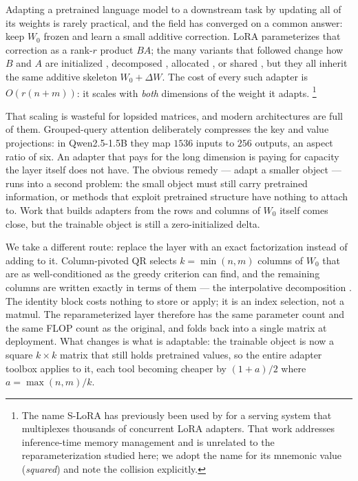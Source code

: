 \documentclass{article}
\theoremstyle{remark}
\begin{document}
Adapting a pretrained language model to a downstream task by updating all of
its weights is rarely practical, and the field has converged on a common
answer: keep $W_0$ frozen and learn a small additive correction. LoRA
\citep{hu2022lora} parameterizes that correction as a rank-$r$ product $BA$;
the many variants that followed change how $B$ and $A$ are initialized
\citep{meng2024pissa,wang2025milora}, decomposed \citep{liu2024dora},
allocated \citep{zhang2023adalora}, or shared
\citep{kopiczko2024vera,balazy2024loraxs}, but they all inherit the same
additive skeleton $W_0 + \Delta W$. The cost of every such adapter is
$O(r(n+m))$: it scales with \emph{both} dimensions of the weight it adapts.%
\footnote{The name S-LoRA has previously been used by \citet{sheng2024slora}
for a serving system that multiplexes thousands of concurrent LoRA adapters.
That work addresses inference-time memory management and is unrelated to the
reparameterization studied here; we adopt the name for its mnemonic value
(\emph{squared}) and note the collision explicitly.}

That scaling is wasteful for lopsided matrices, and modern architectures are
full of them. Grouped-query attention \citep{ainslie2023gqa} deliberately
compresses the key and value projections: in Qwen2.5-1.5B
\citep{qwen2024qwen25} they map $1536$ inputs to $256$ outputs, an aspect ratio
of six. An adapter that pays for the long dimension is paying for capacity the
layer itself does not have. The obvious remedy --- adapt a smaller object ---
runs into a second problem: the small object must still carry pretrained
information, or methods that exploit pretrained structure
\citep{liu2024dora,meng2024pissa} have nothing to attach to. Work that builds
adapters from the rows and columns of $W_0$ itself
\citep{wang2025pmss,fawi2024curlora} comes close, but the trainable object is
still a zero-initialized delta.

We take a different route: replace the layer with an exact factorization
instead of adding to it. Column-pivoted QR \citep{businger1965pivotedqr}
selects $k=\min(n,m)$ columns of $W_0$ that are as well-conditioned as the
greedy criterion can find, and the remaining columns are written exactly in
terms of them --- the interpolative decomposition \citep{cheng2005id}. The
identity block costs nothing to store or apply; it is an index selection, not
a matmul. The reparameterized layer therefore has the same parameter count and
the same FLOP count as the original, and folds back into a single matrix at
deployment. What changes is what is adaptable: the trainable object is now a
square $k\times k$ matrix that still holds pretrained values, so the entire
adapter toolbox applies to it, each tool becoming cheaper by $(1+a)/2$ where
$a=\max(n,m)/k$.
\end{document}
